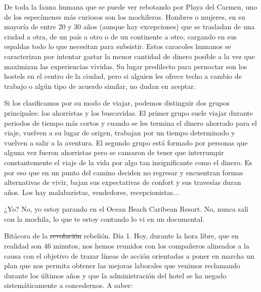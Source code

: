 \documentclass[12pt,twoside,openright,a5paper]{book}
\begin{document}
De toda la fauna humana que se puede ver rebotando por Playa del Carmen, uno
de los especímenes más curiosos son los mochileros. Hombres o mujeres,
en su mayoría de entre 20 y 30 años (aunque hay excepciones) que se
trasladan de una ciudad a otra, de un país a otro o de un continente a
otro, cargando en sus espaldas todo lo que necesitan para subsistir. Estos
caracoles humanos se caracterizan por intentar gastar la menor cantidad de
dinero posible a la vez que maximizan las experiencias vividas. Su lugar
predilecto para pernoctar son los hostels en el centro de la ciudad, pero
si alguien les ofrece techo a cambio de trabajo o algún tipo de acuerdo
similar, no dudan en aceptar.

Si los clasificamos por su modo de viajar, podemos distinguir dos grupos
principales: los ahorristas y los buscavidas. El primer grupo suele viajar
durante periodos de tiempo más cortos y cuando se les termina el dinero
ahorrado para el viaje, vuelven a su lugar de origen, trabajan por un
tiempo determinado y vuelven a salir a la aventura. El segundo grupo está
formado por personas que alguna vez fueron ahorristas pero se cansaron
de tener que interrumpir constantemente el viaje de la vida por algo tan
insignificante como el dinero. Es por eso que en un punto del camino
deciden no regresar y encuentran formas alternativas de vivir, bajan sus
expectativas de confort y sus travesías duran años. Los hay malabaristas,
vendedores, recepcionistas...

¿Yo? No, yo estoy parando en el Ocean Beach Caribean Resort. No, nunca
salí con la mochila, lo que te estoy contando lo vi en un documental.

\afterpage{}
\vspace{0.5cm}
\hrulefill\hspace{0.2cm} \decofourleft\decofourright \hspace{0.2cm} \hrulefill
\vspace{0.5cm}

Bitácora de la \st{revolución} rebelión. Día 1. Hoy, durante la hora libre, que en
realidad son 46 minutos, nos hemos reunidos con los compañeros alineados
a la causa con el objetivo de trazar líneas de acción orientadas a poner
en marcha un plan que nos permita obtener las mejoras laborales que venimos
reclamando durante los últimos años y que la administración del hotel
se ha negado sistemáticamente a concedernos. A saber:
\end{document}

